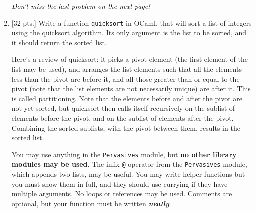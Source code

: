 \documentclass[11pt]{article}
\begin{document}
\begin{enumerate}
          \pagebreak

          \hspace*{0mm}

          \enlargethispage{6mm}

          \vspace{\fill}

          \begin{center}

            \huge

            \textsl{\textcolor{black}{Don't miss the last problem on the next
            page!}}

          \end{center}

          \pagebreak


    \item {[32 pts.]} Write a function \texttt{quicksort} in OCaml, that
          will sort a list of integers using the quicksort algorithm.  Its
          only argument is the list to be sorted, and it should return the
          sorted list.

          Here's a review of quicksort: it picks a pivot element (the first
          element of the list may be used), and arranges the list elements
          such that all the elements less than the pivot are before it, and
          all those greater than or equal to the pivot (note that the list
          elements are not necessarily unique) are after it.  This is called
          partitioning.  Note that the elements before and after the pivot
          are not yet sorted, but quicksort then calls itself recursively
          on the sublist of elements before the pivot, and on the sublist of
          elements after the pivot.  Combining the sorted sublists, with the
          pivot between them, results in the sorted list.

          You may use anything in the \texttt{Pervasives} module, but
          \textbf{no other library modules may be used}. The infix
          \texttt{@} operator from the \texttt{Pervasives} module, which
          appends two lists, may be useful.  You may write helper functions
          but you must show them in full, and they should use currying if
          they have multiple arguments.  No loops or references may be used.
          Comments are optional, but your function must be written
          \textbf{\underline{\underline{\emph{\large neatly}}}}.

          \medskip

          \enlargethispage{8mm}


          \pagebreak


  \end{enumerate}
\end{document}
